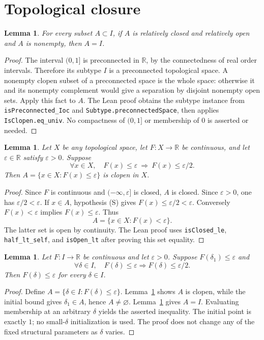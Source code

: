 \documentclass[11pt]{article}
\newtheorem{lemma}[theorem]{Lemma}
\theoremstyle{definition}
\theoremstyle{remark}
\newcommand{\R}{\mathbb R}
\numberwithin{equation}{section}
\providecommand{\I}{I}
\begin{document}
\section{Topological closure}
\begin{lemma}\label{closure:clopen}
For every subset $A\subset\I$, if $A$ is relatively closed and
relatively open and $A$ is nonempty, then $A=\I$.
\end{lemma}
\begin{proof}
The interval $(0,1]$ is preconnected in $\R$, by the connectedness of
real order intervals.  Therefore its subtype $\I$ is a preconnected
topological space.  A nonempty clopen subset of a preconnected space is
the whole space: otherwise it and its nonempty complement would give a
separation by disjoint nonempty open sets.  Apply this fact to $A$.
The Lean proof obtains the subtype instance from
\texttt{isPreconnected\_Ioc} and \texttt{Subtype.preconnectedSpace},
then applies \texttt{IsClopen.eq\_univ}.  No compactness of $(0,1]$ or
membership of $0$ is asserted or needed.
\end{proof}

\begin{lemma}\label{closure:sublevel}
Let $X$ be any topological space, let $F:X\to\R$ be continuous,
and let $\varepsilon\in\R$ satisfy $\varepsilon>0$.  Suppose
\[
 \forall x\in X,\quad
 F(x)\leq\varepsilon\ \Longrightarrow\ F(x)\leq\varepsilon/2.
 \tag{S}
\]
Then $A=\{x\in X:F(x)\leq\varepsilon\}$ is clopen in $X$.
\end{lemma}
\begin{proof}
Since $F$ is continuous and $(-\infty,\varepsilon]$ is closed,
$A$ is closed.  Since $\varepsilon>0$, one has
$\varepsilon/2<\varepsilon$.  If $x\in A$, hypothesis (S) gives
$F(x)\leq\varepsilon/2<\varepsilon$.  Conversely
$F(x)<\varepsilon$ implies $F(x)\leq\varepsilon$.  Thus
\[
 A=\{x\in X:F(x)<\varepsilon\}.
\]
The latter set is open by continuity.  The Lean proof uses
\texttt{isClosed\_le}, \texttt{half\_lt\_self}, and
\texttt{isOpen\_lt} after proving this set equality.
\end{proof}

\begin{lemma}\label{closure:propagation}
Let $F:\I\to\R$ be continuous and let $\varepsilon>0$.
Suppose $F(\delta_1)\leq\varepsilon$ and
\[
 \forall\delta\in\I,\quad F(\delta)\leq\varepsilon
       \Longrightarrow F(\delta)\leq\varepsilon/2.
 \tag{P}
\]
Then $F(\delta)\leq\varepsilon$ for every $\delta\in\I$.
\end{lemma}
\begin{proof}
Define $A=\{\delta\in\I:F(\delta)\leq\varepsilon\}$.
Lemma~\ref{closure:sublevel} shows $A$ is clopen, while the initial
bound gives $\delta_1\in A$, hence $A\ne\varnothing$.
Lemma~\ref{closure:clopen} gives $A=\I$.  Evaluating membership at an
arbitrary $\delta$ yields the asserted inequality.
The initial point is exactly $1$; no small-$\delta$ initialization is
used.  The proof does not change any of the fixed structural parameters
as $\delta$ varies.
\end{proof}
\end{document}

